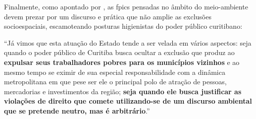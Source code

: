 	Finalmente, como apontado por , as \gls{fpic}s pensadas no âmbito do meio-ambiente devem prezar por um discurso e prática que não amplie as exclusões socioespaciais, escamoteando posturas higienistas do poder público curitibano:
	
	\begin{citacao}
		``Já vimos que esta atuação do Estado tende a ser velada em vários aspectos: seja quando o poder público de Curitiba busca ocultar a exclusão que produz ao \textbf{expulsar seus trabalhadores pobres para os municípios vizinhos} e ao mesmo tempo se eximir de sua especial responsabilidade com a dinâmica metropolitana em que pese ser ele o principal polo de atração de pessoas, mercadorias e investimentos da região; \textbf{seja quando	ele busca justificar as violações de direito que comete utilizando-se de um discurso ambiental que se pretende neutro, mas é arbitrário}.''
	\end{citacao}
	
	
	\postextual
	
	
	
	
	\renewcommand{\glossaryname}{Glossário}
	\renewcommand*{\glsseeformat}[3][\seename]{\textit{#1}
		\glsseelist{#2}}
	
	
